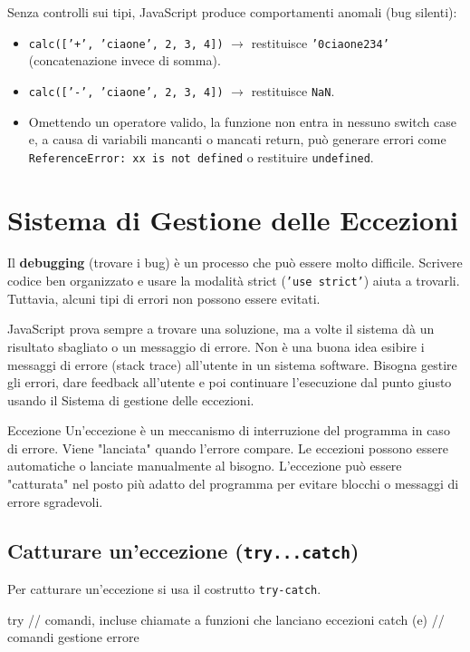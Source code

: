 Senza controlli sui tipi, JavaScript produce comportamenti anomali (bug silenti):
\begin{itemize}
    \item \texttt{calc(['+', 'ciaone', 2, 3, 4])} $\rightarrow$ restituisce \texttt{'0ciaone234'} (concatenazione invece di somma).
    \item \texttt{calc(['-', 'ciaone', 2, 3, 4])} $\rightarrow$ restituisce \texttt{NaN}.
    \item Omettendo un operatore valido, la funzione non entra in nessuno switch case e, a causa di variabili mancanti o mancati return, può generare errori come \texttt{ReferenceError: xx is not defined} o restituire \texttt{undefined}.
\end{itemize}

\section{Sistema di Gestione delle Eccezioni}

Il \textbf{debugging} (trovare i bug) è un processo che può essere molto difficile. Scrivere codice ben organizzato e usare la modalità strict (\texttt{'use strict'}) aiuta a trovarli. Tuttavia, alcuni tipi di errori non possono essere evitati. 

JavaScript prova sempre a trovare una soluzione, ma a volte il sistema dà un risultato sbagliato o un messaggio di errore. Non è una buona idea esibire i messaggi di errore (stack trace) all'utente in un sistema software. Bisogna gestire gli errori, dare feedback all'utente e poi continuare l'esecuzione dal punto giusto usando il Sistema di gestione delle eccezioni.


\begin{definition}{Eccezione}
Un'eccezione è un meccanismo di interruzione del programma in caso di errore. Viene "lanciata" quando l'errore compare.
Le eccezioni possono essere automatiche o lanciate manualmente al bisogno. L'eccezione può essere "catturata" nel posto più adatto del programma per evitare blocchi o messaggi di errore sgradevoli.
\end{definition}

\subsection{Catturare un'eccezione (\texttt{try...catch})}
Per catturare un'eccezione si usa il costrutto \texttt{try-catch}.

\begin{jsbox}[title={Blocco try-catch}]
try {
  // comandi, incluse chiamate a funzioni che lanciano eccezioni
} catch (e) {
  // comandi gestione errore
}
\end{jsbox}

